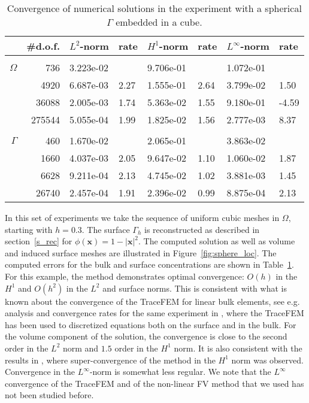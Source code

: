 \documentclass{article}
\newcommand{\bx}{\mathbf x}
\begin{document}
{\begin{table}
\begin{center}
\caption{Convergence of numerical solutions in the experiment with a spherical $\Gamma$ embedded in a cube.
\label{tab:sphere_uni}  }\smallskip
\small
\begin{tabular}{rr|llllll}\hline
&\#d.o.f. & $L^2$-norm & rate & $H^1$-norm& rate & $L^\infty$-norm& rate \\ \hline\\[-2ex]
{$\Omega$}
&736&	 3.223e-02 &        & 9.706e-01  &        &  1.072e-01  &      \\
&4920&	 6.687e-03 &    2.27& 1.555e-01  &    2.64&  3.799e-02  &1.50\\
&36088&  2.005e-03 &    1.74& 5.363e-02  &    1.55&  9.180e-01  &-4.59 \\
&275544& 5.055e-04 &    1.99& 1.825e-02  &    1.56&  2.777e-03  &8.37 \\  \hline\\[-2ex]

{$\Gamma$}
&460&      1.670e-02   &    &  2.065e-01&     & 3.863e-02&     \\
&1660&     4.037e-03   &2.05&  9.647e-02& 1.10& 1.060e-02&1.87 \\
&6628&     9.211e-04   &2.13&  4.745e-02& 1.02& 3.881e-03&1.45  \\
&26740&    2.457e-04   &1.91&  2.396e-02& 0.99& 8.875e-04&2.13  \\  \hline
\end{tabular}
\end{center}
\end{table}

In this set of experiments we take the sequence of uniform cubic meshes in $\Omega$, starting with $h=0.3$. The surface $\Gamma_h$ is reconstructed as described in section~\ref{s_rec} for $\phi(\bx)=1-|\bx|^2$. The computed solution as well as volume and induced surface meshes are illustrated in Figure~\ref{fig:sphere_loc}.
The computed errors for the bulk and surface concentrations are shown in Table~\ref{tab:sphere_uni}. For this example, the method
demonstrates  optimal convergence: $O(h)$ in the $H^1$ and $O(h^2)$ in the $L^2$ and surface norms. This is consistent with what is known about the convergence of the TraceFEM for linear bulk elements, see e.g. analysis and convergence rates for the same
experiment in \cite{gross2015trace}, where the TraceFEM has been used to discretized equations both on the surface and in the bulk.  For the volume component of the solution, the convergence is close to the second order in the $L^2$ norm and $1.5$ order in the $H^1$ norm.  It is also consistent with the results in \cite{Lipnikov:12}, where  super-convergence of the method in the $H^1$ norm was observed.  Convergence in the $L^\infty$-norm is somewhat less regular. We note that the $L^\infty$ convergence of the TraceFEM and of the non-linear FV method that we used has not been studied before.
\medskip

}
\end{document}
